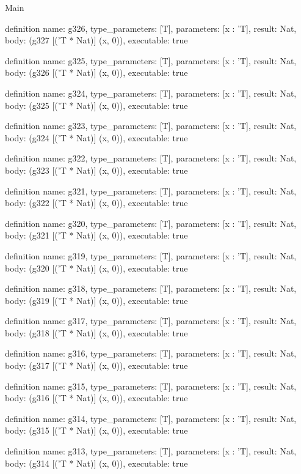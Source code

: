 \begin{lexlean}{Main}
\begin{semanticmodule}
definition{
  name: g326,
  type_parameters: [T],
  parameters: [x : 'T],
  result: Nat,
  body: (g327 [('T * Nat)] (x, 0)),
  executable: true
}

definition{
  name: g325,
  type_parameters: [T],
  parameters: [x : 'T],
  result: Nat,
  body: (g326 [('T * Nat)] (x, 0)),
  executable: true
}

definition{
  name: g324,
  type_parameters: [T],
  parameters: [x : 'T],
  result: Nat,
  body: (g325 [('T * Nat)] (x, 0)),
  executable: true
}

definition{
  name: g323,
  type_parameters: [T],
  parameters: [x : 'T],
  result: Nat,
  body: (g324 [('T * Nat)] (x, 0)),
  executable: true
}

definition{
  name: g322,
  type_parameters: [T],
  parameters: [x : 'T],
  result: Nat,
  body: (g323 [('T * Nat)] (x, 0)),
  executable: true
}

definition{
  name: g321,
  type_parameters: [T],
  parameters: [x : 'T],
  result: Nat,
  body: (g322 [('T * Nat)] (x, 0)),
  executable: true
}

definition{
  name: g320,
  type_parameters: [T],
  parameters: [x : 'T],
  result: Nat,
  body: (g321 [('T * Nat)] (x, 0)),
  executable: true
}

definition{
  name: g319,
  type_parameters: [T],
  parameters: [x : 'T],
  result: Nat,
  body: (g320 [('T * Nat)] (x, 0)),
  executable: true
}

definition{
  name: g318,
  type_parameters: [T],
  parameters: [x : 'T],
  result: Nat,
  body: (g319 [('T * Nat)] (x, 0)),
  executable: true
}

definition{
  name: g317,
  type_parameters: [T],
  parameters: [x : 'T],
  result: Nat,
  body: (g318 [('T * Nat)] (x, 0)),
  executable: true
}

definition{
  name: g316,
  type_parameters: [T],
  parameters: [x : 'T],
  result: Nat,
  body: (g317 [('T * Nat)] (x, 0)),
  executable: true
}

definition{
  name: g315,
  type_parameters: [T],
  parameters: [x : 'T],
  result: Nat,
  body: (g316 [('T * Nat)] (x, 0)),
  executable: true
}

definition{
  name: g314,
  type_parameters: [T],
  parameters: [x : 'T],
  result: Nat,
  body: (g315 [('T * Nat)] (x, 0)),
  executable: true
}

definition{
  name: g313,
  type_parameters: [T],
  parameters: [x : 'T],
  result: Nat,
  body: (g314 [('T * Nat)] (x, 0)),
  executable: true
}


\end{semanticmodule}
\end{lexlean}
